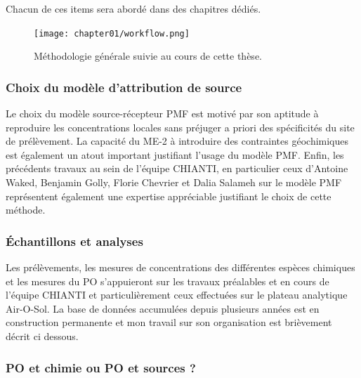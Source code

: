 Chacun de ces items sera abordé dans des chapitres dédiés.

\begin{figure}[ht]
    \centering
    \texttt{[image: chapter01/workflow.png]}
    \caption{Méthodologie générale suivie au cours de cette thèse.}%
    \label{fig:chapter01/workflow}
\end{figure}


\subsubsection{Choix du modèle d'attribution de source}%
\label{ssub:choix_du_modèle_d_attribution_de_source}

Le choix du modèle source-récepteur PMF est motivé par son aptitude à reproduire les
concentrations locales sans préjuger a priori des spécificités du site de prélèvement. La
capacité du ME-2 à introduire des contraintes géochimiques est également un atout
important justifiant l'usage du modèle PMF.
Enfin, les précédents travaux au sein de l'équipe CHIANTI, en particulier ceux d'Antoine Waked, Benjamin Golly,
Florie Chevrier et Dalia Salameh sur le modèle PMF représentent également une expertise
appréciable justifiant le choix de cette méthode.

\subsubsection{Échantillons et analyses}%
\label{ssub:échantillons_et_analyses}

Les prélèvements, les mesures de concentrations des différentes espèces chimiques et les
mesures du PO s'appuieront sur les travaux préalables et en cours de l'équipe CHIANTI et
particulièrement ceux effectuées sur le plateau analytique Air-O-Sol.
La base de données accumulées depuis plusieurs années est en construction permanente et mon travail sur son organisation est brièvement décrit ci dessous.

\subsubsection{PO et chimie ou PO et sources ?}%
\label{ssub:chimie_ou_sources_}

